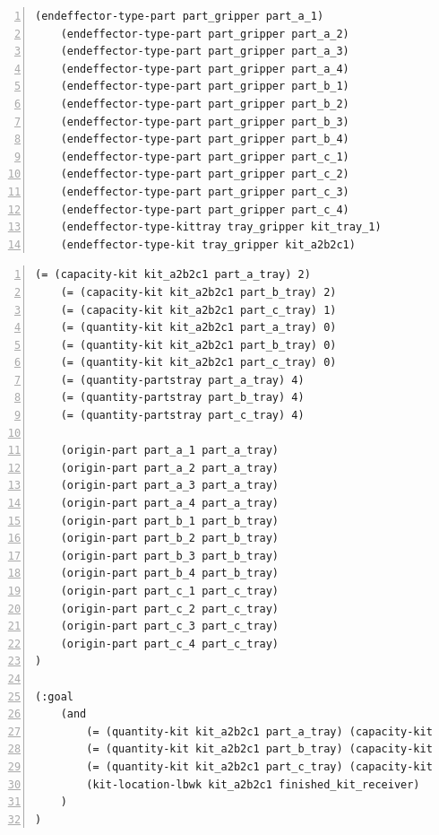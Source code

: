 \begin{center}
\begin{minipage}{.5\paperwidth}
\begin{mylisting}
\begin{Verbatim}[commandchars=\\\{\},fontsize=\scriptsize, numbers=left, numbersep=2pt]
    (endeffector-type-part part_gripper part_a_1)
    (endeffector-type-part part_gripper part_a_2)
    (endeffector-type-part part_gripper part_a_3)
    (endeffector-type-part part_gripper part_a_4)
    (endeffector-type-part part_gripper part_b_1)
    (endeffector-type-part part_gripper part_b_2)
    (endeffector-type-part part_gripper part_b_3)
    (endeffector-type-part part_gripper part_b_4)
    (endeffector-type-part part_gripper part_c_1)
    (endeffector-type-part part_gripper part_c_2)
    (endeffector-type-part part_gripper part_c_3)
    (endeffector-type-part part_gripper part_c_4)
    (endeffector-type-kittray tray_gripper kit_tray_1)
    (endeffector-type-kit tray_gripper kit_a2b2c1)
\end{Verbatim}
\end{mylisting}
\end{minipage}

\begin{minipage}{.5\paperwidth}
\begin{mylisting}
\begin{Verbatim}[commandchars=\\\{\},fontsize=\scriptsize,  firstnumber=continue, numbers=left, numbersep=2pt]	
    (= (capacity-kit kit_a2b2c1 part_a_tray) 2)
    (= (capacity-kit kit_a2b2c1 part_b_tray) 2)
    (= (capacity-kit kit_a2b2c1 part_c_tray) 1)
    (= (quantity-kit kit_a2b2c1 part_a_tray) 0)
    (= (quantity-kit kit_a2b2c1 part_b_tray) 0)
    (= (quantity-kit kit_a2b2c1 part_c_tray) 0)
    (= (quantity-partstray part_a_tray) 4)
    (= (quantity-partstray part_b_tray) 4)
    (= (quantity-partstray part_c_tray) 4)

    (origin-part part_a_1 part_a_tray)
    (origin-part part_a_2 part_a_tray)
    (origin-part part_a_3 part_a_tray)
    (origin-part part_a_4 part_a_tray)
    (origin-part part_b_1 part_b_tray)
    (origin-part part_b_2 part_b_tray)
    (origin-part part_b_3 part_b_tray)
    (origin-part part_b_4 part_b_tray)
    (origin-part part_c_1 part_c_tray)
    (origin-part part_c_2 part_c_tray)
    (origin-part part_c_3 part_c_tray)
    (origin-part part_c_4 part_c_tray)
)

(:goal
    (and
        (= (quantity-kit kit_a2b2c1 part_a_tray) (capacity-kit kit_a2b2c1 part_a_tray))
        (= (quantity-kit kit_a2b2c1 part_b_tray) (capacity-kit kit_a2b2c1 part_b_tray))
        (= (quantity-kit kit_a2b2c1 part_c_tray) (capacity-kit kit_a2b2c1 part_c_tray))
        (kit-location-lbwk kit_a2b2c1 finished_kit_receiver)
    )
)
\end{Verbatim}
\end{mylisting}
\end{minipage}
\end{center}


